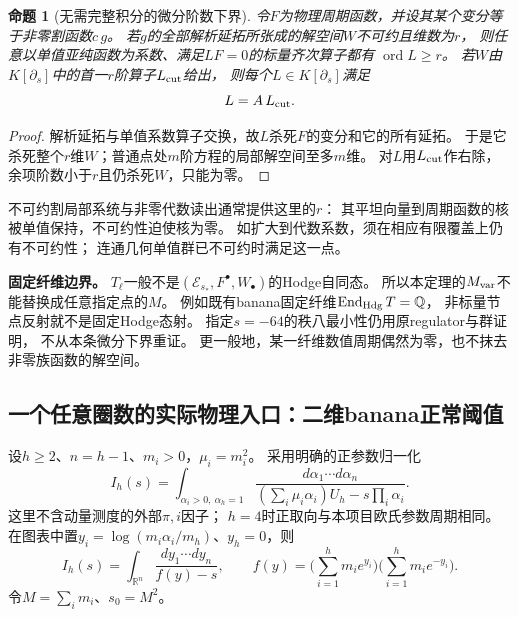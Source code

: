 \documentclass[11pt,a4paper]{ctexart}
\theoremstyle{cnplain}\newtheorem{theorem}{定理}[section]
\newtheorem{proposition}[theorem]{命题}
\theoremstyle{definition}\newtheorem{definition}[theorem]{定义}
\theoremstyle{remark}\newtheorem{remark}[theorem]{注}
\newcommand{\Q}{\mathbb Q}\newcommand{\cC}{\mathcal C}
\begin{document}
\begin{proposition}[无需完整积分的微分阶数下界]\label{prop:order}
令$F$为物理周期函数，并设其某个变分等于非零割函数$c\,g$。
若$g$的全部解析延拓所张成的解空间$W$不可约且维数为$r$，
则任意以单值亚纯函数为系数、满足$LF=0$的标量齐次算子都有
$\operatorname{ord}L\ge r$。
若$W$由$K[\partial_s]$中的首一$r$阶算子$L_{\rm cut}$给出，
则每个$L\in K[\partial_s]$满足
\[
 L=A\,L_{\rm cut}.
\]
\end{proposition}
\begin{proof}
解析延拓与单值系数算子交换，故$L$杀死$F$的变分和它的所有延拓。
于是它杀死整个$r$维$W$；普通点处$m$阶方程的局部解空间至多$m$维。
对$L$用$L_{\rm cut}$作右除，余项阶数小于$r$且仍杀死$W$，只能为零。
\end{proof}
不可约割局部系统与非零代数读出通常提供这里的$r$：
其平坦向量到周期函数的核被单值保持，不可约性迫使核为零。
如扩大到代数系数，须在相应有限覆盖上仍有不可约性；
连通几何单值群已不可约时满足这一点。

\textbf{固定纤维边界。}
$T_\ell$一般不是$(\mathcal E_{s_*},F^\bullet,W_\bullet)$的Hodge自同态。
所以本定理的$M_{\rm var}$不能替换成任意指定点的$M$。
例如既有banana固定纤维$\operatorname{End}_{\rm Hdg}T=\Q$，
非标量节点反射就不是固定Hodge态射。
指定$s=-64$的秩八最小性仍用原regulator与群证明，
不从本条微分下界重证。
更一般地，某一纤维数值周期偶然为零，也不抹去非零族函数的解空间。

\subsection{一个任意圈数的实际物理入口：二维banana正常阈值}
设$h\ge2$、$n=h-1$、$m_i>0$，$\mu_i=m_i^2$。
采用明确的正参数归一化
\[
 I_h(s)=\int_{\alpha_i>0,\ \alpha_h=1}
 \frac{d\alpha_1\cdots d\alpha_n}
 {(\sum_i\mu_i\alpha_i)U_h-s\prod_i\alpha_i}.
\]
这里不含动量测度的外部$\pi,i$因子；
$h=4$时正取向与本项目欧氏参数周期相同。
在图表中置$y_i=\log(m_i\alpha_i/m_h)$、$y_h=0$，则
\[
 I_h(s)=\int_{\mathbb R^n}\frac{dy_1\cdots dy_n}{f(y)-s},
 \qquad
 f(y)=\Big(\sum_{i=1}^h m_i e^{y_i}\Big)
       \Big(\sum_{i=1}^h m_i e^{-y_i}\Big).
\]
令$M=\sum_i m_i$、$s_0=M^2$。
\end{document}
